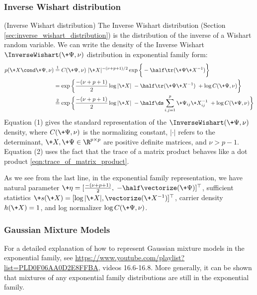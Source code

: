 \documentclass{article} %
\newcommand{\sufficientStatsFunction}{\+s}
\newcommand{\carrierDensity}{h}
\newcommand{\naturalParam}{\+\eta}
\begin{document}
\subsubsection{Inverse Wishart distribution}

\begin{example}{(Inverse Wishart distribution)} 
\label{ex:inverse_wishart_as_ef} The Inverse Wishart distribution (Section \ref{sec:inverse_wishart_distribution}) is the distribution of the inverse of a Wishart random variable.   We can write the density of the Inverse Wishart $\InverseWishart(\+\Psi,  \nu)$ distribution in exponential family form:
\begin{align*}
p (\+X  \cond \+\Psi,  \nu) & \stackrel{1}{=} C(\+\Psi,  \nu) \; | \+X | ^{-(\nu + p + 1)/2} \exp \bigg\{ -\half \tr (\+\Psi \+X^{-1} ) \bigg\} \\
& = \exp \bigg\{ \frac{-(\nu + p + 1)}{2}  \log | \+ X | \;  -\half \tr (\+\Psi \+X^{-1} )  \; + \log  C(\+\Psi,  \nu)   \bigg\} \\
& \stackrel{2}{=} \exp \bigg\{ \frac{-(\nu + p + 1)}{2}  \log | \+ X | \;  -\half  \ds\sum_{i,j=1}^p \+\Psi_{ij} \+X^{-1}_{ij} \; + \log  C(\+\Psi,  \nu)   \bigg\} 
\end{align*}
Equation (1) gives the standard representation of the $\InverseWishart(\+\Psi,  \nu)$ density,  where   $C(\+\Psi,  \nu)$ is the normalizing constant,  $| \cdot |$ refers to the determinant,  $\+X,  \+\Psi \in \R^{p \times p}$ are positive definite matrices,  and $\nu > p-1$.    Equation (2) uses the fact that the trace of a matrix product behaves like a dot product \eqref{eqn:trace_of_matrix_product}.      


As we see from the last line,  in the exponential family representation,  we have natural parameter $\naturalParam = [\frac{-(\nu + p + 1)}{2},  \; -\half \vectorize (\+\Psi)]^\top$, sufficient statistics $\sufficientStatsFunction(\+X) = [\log | \+X | , \vectorize (\+X^{-1})]^\top$, carrier density $\carrierDensity(\+X)=1$, and log normalizer $ \log  C(\+\Psi,  \nu)$.   
  
\end{example} 


\subsubsection{Gaussian Mixture Models}


For a detailed explanation of how to represent Gaussian mixture models in the exponential family, see \url{https://www.youtube.com/playlist?list=PLD0F06AA0D2E8FFBA}, videos 16.6-16.8. More generally, it can be shown that mixtures of any exponential family distributions are still in the exponential family. 
\end{document}
